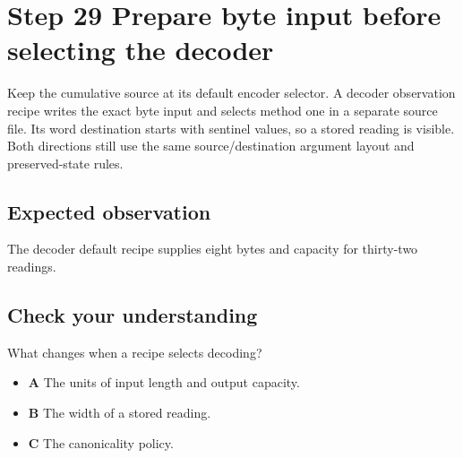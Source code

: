 \section{Step 29 Prepare byte input before selecting the decoder}\label{delta-s29}

Keep the cumulative source at its default encoder selector. A decoder observation recipe writes the exact byte input and selects method one in a separate source file. Its word destination starts with sentinel values, so a stored reading is visible. Both directions still use the same source/destination argument layout and preserved-state rules.

\subsection{Expected observation}
The decoder default recipe supplies eight bytes and capacity for thirty-two readings.

\subsection{Check your understanding}
What changes when a recipe selects decoding?

\begin{itemize}
  \item \textbf{A} The units of input length and output capacity.
  \item \textbf{B} The width of a stored reading.
  \item \textbf{C} The canonicality policy.
\end{itemize}
